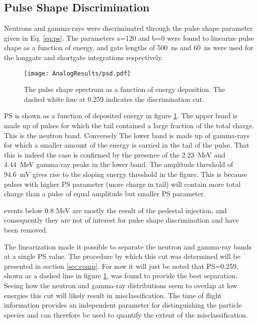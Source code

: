 \documentclass[main.tex]{subfiles}
\begin{document}
\subsection{Pulse Shape Discrimination}
Neutrons and gamma-rays were discriminated through the pulse shape parameter given in Eq. \ref{eq:ps}. The parameters a=120 and b=0 were found to linearize pulse shape as a function of energy, and gate lengths of \SI{500}{\ns} and \SI{60}{ns} were used for the longgate and shortgate integrations respectively.

\begin{figure}[ht]
    \centering
        \texttt{[image: AnalogResults/psd.pdf]}
        \caption[PSD spectrum, analog setup.]{The pulse shape spectrum as a function of energy deposition. The dashed white line at 0.259 indicates the discrimination cut.}
        \label{fig:psd_a}
\end{figure}

PS is shown as a function of deposited energy in figure \ref{fig:psd_a}. The upper band is made up of pulses for which the tail contained a large fraction of the total charge. This is the neutron band. Conversely The lower band is made up of gamma-rays for which a smaller amount of the energy is carried in the tail of the pulse. That this is indeed the case is confirmed by the presence of the \SI{2.23}{MeV} and \SI{4.44}{MeV} gamma-ray peaks in the lower band. The amplitude threshold of \SI{94.6}{mV} gives rise to the sloping energy threshold in the figure. This is because pulses with higher PS parameter (more charge in tail) will contain more total charge than a pulse of equal amplitude but smaller PS parameter.


events below 0.8 MeV are mostly the result of the pedestal injection, and consequently they are not of interest for pulse shape discrimination and have been removed.

The linearization made it possible to separate the neutron and gamma-ray bands at a single PS value. The procedure by which this cut was determined will be presented in section \ref{sec:comp}. For now it will just be noted that PS=0.259, shown as a dashed line in figure \ref{fig:psd_a}, was found to provide the best separation. Seeing how the neutron and gamma-ray distributions seem to overlap at low energies this cut will likely result in misclassification. The time of flight information provides an independent parameter for distinguishing the particle species and can therefore be used to quantify the extent of the misclassification.
\end{document}
